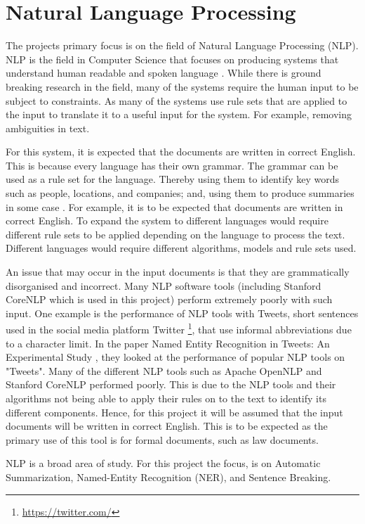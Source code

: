 \section{Natural Language Processing}
\par The projects primary focus is on the field of Natural Language Processing (NLP). NLP is the field in Computer Science that focuses on producing systems that understand human readable and spoken language \cite{nlp}. While there is ground breaking research in the field, many of the systems require the human input to be subject to constraints. As many of the systems use rule sets that are applied to the input to translate it to a useful input for the system. For example, removing ambiguities in text. 
\par For this system, it is expected that the documents are written in correct English. This is because every language has their own grammar. The grammar can be used as a rule set for the language. Thereby using them to identify key words such as people, locations, and companies; and, using them to produce summaries in some case \cite{dorrzajicschwartz2003}. For example, it is to be expected that documents are written in correct English. To expand the system to different languages would require different rule sets to be applied depending on the language to process the text. Different languages would require different algorithms, models and rule sets used.
\par An issue that may occur in the input documents is that they are grammatically disorganised and incorrect. Many NLP software tools (including Stanford CoreNLP which is used in this project) perform extremely poorly with such input. One example is the performance of NLP tools with Tweets, short sentences used in the social media platform Twitter \footnote{\url{https://twitter.com/}}, that use informal abbreviations due to a character limit. In the paper Named Entity Recognition in Tweets: An Experimental Study \cite{ritter2011}, they looked at the performance of popular NLP tools on "Tweets". Many of the different NLP tools such as Apache OpenNLP and Stanford CoreNLP performed poorly. This is due to the NLP tools and their algorithms not being able to apply their rules on to the text to identify its different components. Hence, for this project it will be assumed that the input documents will be written in correct English. This is to be expected as the primary use of this tool is for formal documents, such as law documents.
\par NLP is a broad area of study. For this project the focus, is on Automatic Summarization, Named-Entity Recognition (NER), and Sentence Breaking.

